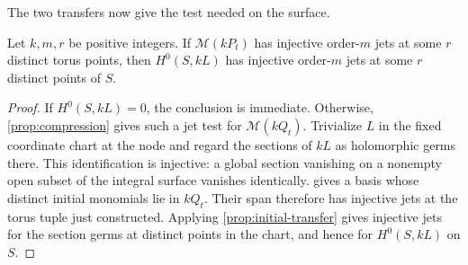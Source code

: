 The two transfers now give the test needed on the surface.

\begin{corollary}
\label{cor:surface-transfer}
Let $k,m,r$ be positive integers.  If $\mathcal{M}(kP_t)$ has injective order-$m$ jets at some $r$ distinct torus points, then $H^0(S,kL)$ has injective order-$m$ jets at some $r$ distinct points of $S$.
\end{corollary}

\begin{proof}
If $H^0(S,kL)=0$, the conclusion is immediate.  Otherwise, \cref{prop:compression} gives such a jet test for $\mathcal{M}(kQ_t)$.  Trivialize $L$ in the fixed coordinate chart at the node and regard the sections of $kL$ as holomorphic germs there. This identification is injective: a global section vanishing on a nonempty open subset of the integral surface vanishes identically.  gives a basis whose distinct initial monomials lie in $kQ_t$.  Their span therefore has injective jets at the torus tuple just constructed.  Applying \cref{prop:initial-transfer} gives injective jets for the section germs at distinct points in the chart, and hence for $H^0(S,kL)$ on $S$.
\end{proof}

